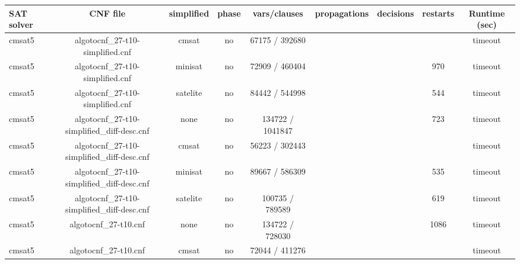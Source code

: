 \begin{appendices}
\begin{table}[p]
  \begin{center}
    \begin{tabular}{l|cccccccc}
        \textbf{SAT solver} & \textbf{CNF file} & \textbf{simplified} & \textbf{phase} & \textbf{vars/clauses} & \textbf{propagations} & \textbf{decisions} & \textbf{restarts} & \textbf{Runtime (sec)} \\
      \hline
  cmsat5                         & algotocnf\_27-t10-simplified.cnf & cmsat      & no    & 67175 / 392680 &           &           &            & timeout \\ %
  cmsat5                         & algotocnf\_27-t10-simplified.cnf & minisat    & no    & 72909 / 460404 &           &           & 970        & timeout \\ %
  cmsat5                         & algotocnf\_27-t10-simplified.cnf & satelite   & no    & 84442 / 544998 &           &           & 544        & timeout \\ %
  cmsat5                         & algotocnf\_27-t10-simplified\_diff-desc.cnf & none       & no    & 134722 / 1041847 &           &           & 723        & timeout \\ %
  cmsat5                         & algotocnf\_27-t10-simplified\_diff-desc.cnf & cmsat      & no    & 56223 / 302443 &           &           &            & timeout \\ %
  cmsat5                         & algotocnf\_27-t10-simplified\_diff-desc.cnf & minisat    & no    & 89667 / 586309 &           &           & 535        & timeout \\ %
  cmsat5                         & algotocnf\_27-t10-simplified\_diff-desc.cnf & satelite   & no    & 100735 / 789589 &           &           & 619        & timeout \\ %
  cmsat5                         & algotocnf\_27-t10.cnf          & none       & no    & 134722 / 728030 &           &           & 1086       & timeout \\ %
  cmsat5                         & algotocnf\_27-t10.cnf          & cmsat      & no    & 72044 / 411276 &           &           &            & timeout \\ %

\end{tabular}
\end{center}
\end{table}
\end{appendices}
